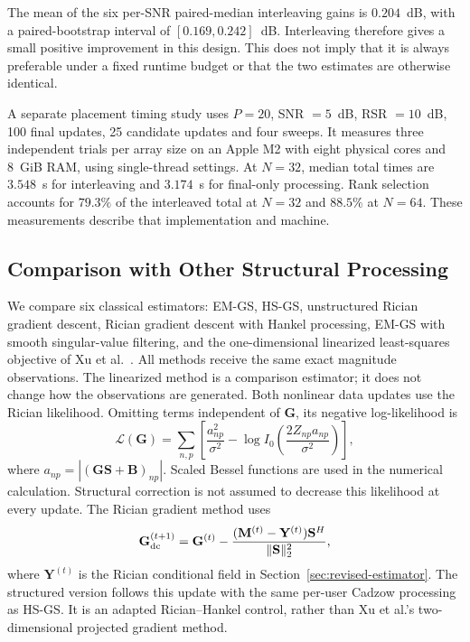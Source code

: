 \documentclass[journal]{IEEEtran}
\begin{document}
The mean of the six per-SNR paired-median interleaving gains is
$0.204$~dB, with a paired-bootstrap interval of $[0.169,0.242]$~dB.
Interleaving therefore gives a small positive improvement in this design.
This does not imply that it is always preferable under a fixed runtime
budget or that the two estimates are otherwise identical.

A separate placement timing study uses $P=20$, SNR $=5$~dB,
RSR $=10$~dB, 100 final updates, 25 candidate updates and four sweeps.
It measures three independent trials per array size on an Apple M2
with eight physical cores and 8~GiB RAM, using single-thread settings.
At $N=32$, median total times are $3.548$~s for interleaving and
$3.174$~s for final-only processing. Rank selection accounts for
$79.3\%$ of the interleaved total at $N=32$ and $88.5\%$ at $N=64$.
These measurements describe that implementation and machine.

\subsection{Comparison with Other Structural Processing}
\label{sec:revision-structured-comparisons}

We compare six classical estimators: EM-GS, HS-GS, unstructured Rician
gradient descent, Rician gradient descent with Hankel processing, EM-GS
with smooth singular-value filtering, and the one-dimensional linearized
least-squares objective of Xu et al.~\cite{xu2025}. All methods receive
the same exact magnitude observations. The linearized method is a
comparison estimator; it does not change how the observations are generated.
Both nonlinear data updates use the Rician likelihood. Omitting terms
independent of $\mathbf G$, its negative log-likelihood is
\begin{equation}
\mathcal L(\mathbf G)=\sum_{n,p}\left[
\frac{a_{np}^{2}}{\sigma^2}
-\log I_0\!\left(\frac{2Z_{np}a_{np}}{\sigma^2}\right)\right],
\end{equation}
where $a_{np}=|(\mathbf G\mathbf S+\mathbf B)_{np}|$.
Scaled Bessel functions are used in the numerical calculation. Structural
correction is not assumed to decrease this likelihood at every update.
The Rician gradient method uses
\begin{equation}
\mathbf G^{(t+1)}_{\rm dc}
=\mathbf G^{(t)}-
\frac{(\mathbf M^{(t)}-\mathbf Y^{(t)})\mathbf S^H}
     {\|\mathbf S\|_2^2},
\end{equation}
where $\mathbf Y^{(t)}$ is the Rician conditional field in
Section~\ref{sec:revised-estimator}. The structured version follows this
update with the same per-user Cadzow processing as HS-GS. It is an adapted
Rician--Hankel control, rather than Xu et al.'s two-dimensional projected
gradient method.
\end{document}

